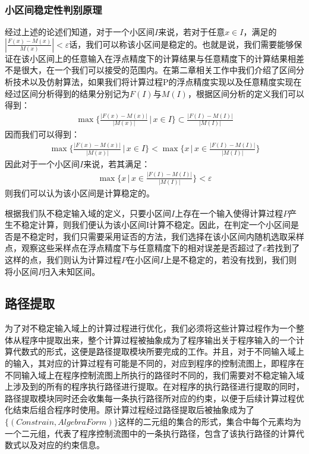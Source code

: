 \subsubsection{小区间稳定性判别原理}

经过上述的论述们知道，对于一个小区间$I$来说，若对于任意$x \in I$，满足的$|\frac{F(x)-M(x)}{M(x)}| < \varepsilon$话，我们可以称该小区间是稳定的。也就是说，我们需要能够保证在该小区间上的任意输入在浮点精度下的计算结果与任意精度下的计算结果相差不是很大，在一个我们可以接受的范围内。在第二章相关工作中我们介绍了区间分析技术以及仿射算法，如果我们将计算过程P的浮点精度实现以及任意精度实现在经过区间分析得到的结果分别记为$F(I)$与$M(I)$，根据区间分析的定义我们可以得到：
\begin{align*}
  \max\Big\lbrace \frac{|F(x)-M(x)|}{|M(x)|} \, \Big| \, x \in I \Big\rbrace \subset \frac{|F(I) - M(I)|}{|M(I)|}
\end{align*}
因而我们可以得到：
\begin{align*}
  \max\Big\lbrace \frac{|F(x)-M(x)|}{|M(x)|} \, \Big| \, x \in I \Big\rbrace < \max \Big\lbrace x \, \Big| \, x \in \frac{|F(I) - M(I)|}{|M(I)|} \Big\rbrace
\end{align*}
因此对于一个小区间$I$来说，若其满足：
\begin{align*}
  \max \Big\lbrace x \, \Big| \, x \in \frac{|F(I) - M(I)|}{|M(I)|} \Big\rbrace < \varepsilon
\end{align*}
则我们可以认为该小区间是计算稳定的。

根据我们队不稳定输入域的定义，只要小区间$I$上存在一个输入使得计算过程$P$产生不稳定计算，则我们便认为该小区间I计算不稳定。因此，在判定一个小区间是否是不稳定时，我们只需要采用证否的方法，我们选择在该小区间内随机选取采样点，观察这些采样点在浮点精度下与任意精度下的相对误差是否超过了$\varepsilon$若找到了这样的点，我们则认为计算过程$P$在小区间$I$上是不稳定的，若没有找到，我们则将小区间$I$归入未知区间。


\subsection{路径提取}
为了对不稳定输入域上的计算过程进行优化，我们必须将这些计算过程作为一个整体从程序中提取出来，整个计算过程被抽象成为了程序输出关于程序输入的一个计算代数式的形式，这便是路径提取模块所要完成的工作。并且，对于不同输入域上的输入，其对应的计算过程有可能是不同的，对应到程序的控制流图上，即程序在不同输入域上在程序控制流图上所执行的路径时不同的，我们需要对不稳定输入域上涉及到的所有的程序执行路径进行提取。在对程序的执行路径进行提取的同时，路径提取模块同时还会收集每一条执行路径所对应的约束，以便于后续计算过程优化结束后组合程序时使用。原计算过程经过路径提取后被抽象成为了$\{(Constrain, AlgebraForm)\}$这样的二元组的集合的形式，集合中每个元素均为一个二元组，代表了程序控制流图中的一条执行路径，包含了该执行路径的计算代数式以及对应的约束信息。


